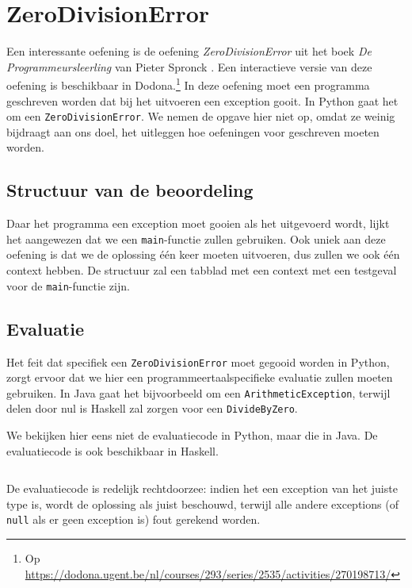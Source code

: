 \inputminted{json}{sources/echo-function/one-testcase.tson}

\section{ZeroDivisionError}\label{sec:oefening-zero}

Een interessante oefening is de oefening \emph{ZeroDivisionError} uit het boek \emph{De Programmeursleerling} van Pieter Spronck \autocite{programmeursleerling}.
Een interactieve versie van deze oefening is beschikbaar in Dodona.\footnote{Op \url{https://dodona.ugent.be/nl/courses/293/series/2535/activities/270198713/}}
In deze oefening moet een programma geschreven worden dat bij het uitvoeren een exception gooit.
In Python gaat het om een \texttt{ZeroDivisionError}.
We nemen de opgave hier niet op, omdat ze weinig bijdraagt aan ons doel, het uitleggen hoe oefeningen voor \tested{} geschreven moeten worden.

\subsection{Structuur van de beoordeling}\label{subsec:oefening-zero-structuur}

Daar het programma een exception moet gooien als het uitgevoerd wordt, lijkt het aangewezen dat we een \texttt{main}-functie zullen gebruiken.
Ook uniek aan deze oefening is dat we de oplossing één keer moeten uitvoeren, dus zullen we ook één context hebben.
De structuur zal een tabblad met een context met een testgeval voor de \texttt{main}-functie zijn.

\subsection{Evaluatie}\label{subsec:oefening-zero-evaluatie}

Het feit dat specifiek een \texttt{ZeroDivisionError} moet gegooid worden in Python, zorgt ervoor dat we hier een programmeertaalspecifieke evaluatie zullen moeten gebruiken.
In Java gaat het bijvoorbeeld om een \texttt{ArithmeticException}, terwijl delen door nul is Haskell zal zorgen voor een \texttt{DivideByZero}.

We bekijken hier eens niet de evaluatiecode in Python, maar die in Java.
De evaluatiecode is ook beschikbaar in Haskell.

\inputminted{java}{sources/division-evaluator.java}

De evaluatiecode is redelijk rechtdoorzee: indien het een exception van het juiste type is, wordt de oplossing als juist beschouwd, terwijl alle andere exceptions (of \texttt{null} als er geen exception is) fout gerekend worden.

